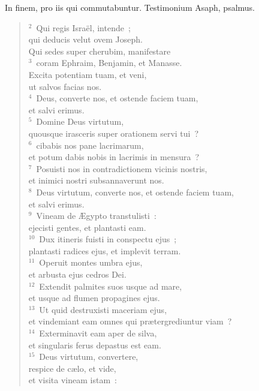 \lettrine[lines=3,image=true,loversize=0.05,lraise=-0.03]{I}{}n finem, pro iis qui commutabuntur. Testimonium Asaph, psalmus.
\begin{flushleft}\begin{verse}\vspace{6pt}${}^{2}$~Qui regis Isra\"el, intende~;\\ qui deducis velut ovem Joseph.\\ Qui sedes super cherubim, manifestare\\
${}^{3}$~coram Ephraim, Benjamin, et Manasse.\\ Excita potentiam tuam, et veni,\\ ut salvos facias nos.\\
${}^{4}$~Deus, converte nos, et ostende faciem tuam,\\ et salvi erimus.\\
${}^{5}$~Domine Deus virtutum,\\ quousque irasceris super orationem servi tui~?\\
${}^{6}$~cibabis nos pane lacrimarum,\\ et potum dabis nobis in lacrimis in mensura~?\\
${}^{7}$~Posuisti nos in contradictionem vicinis nostris,\\ et inimici nostri subsannaverunt nos.\\
${}^{8}$~Deus virtutum, converte nos, et ostende faciem tuam,\\ et salvi erimus.\\
${}^{9}$~Vineam de \AE gypto transtulisti~:\\ ejecisti gentes, et plantasti eam.\\
${}^{10}$~Dux itineris fuisti in conspectu ejus~;\\ plantasti radices ejus, et implevit terram.\\
${}^{11}$~Operuit montes umbra ejus,\\ et arbusta ejus cedros Dei.\\
${}^{12}$~Extendit palmites suos usque ad mare,\\ et usque ad flumen propagines ejus.\\
${}^{13}$~Ut quid destruxisti maceriam ejus,\\ et vindemiant eam omnes qui pr\ae tergrediuntur viam~?\\
${}^{14}$~Exterminavit eam aper de silva,\\ et singularis ferus depastus est eam.\\
${}^{15}$~Deus virtutum, convertere,\\ respice de c\ae lo, et vide,\\ et visita vineam istam~:\\

\end{verse}
\end{flushleft}
